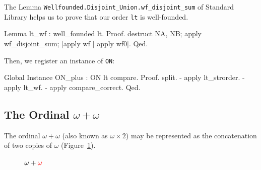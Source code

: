 The Lemma \texttt{Wellfounded.Disjoint\_Union.wf\_disjoint\_sum} of Standard Library
helps us to prove that our order \texttt{lt} is well-founded.

\begin{Coqsrc}
Lemma lt_wf : well_founded lt.
Proof. 
  destruct NA, NB; apply wf_disjoint_sum; [apply wf | apply wf0].
Qed.
\end{Coqsrc}

Then, we register an instance of \texttt{ON}:

\begin{Coqsrc}
Global Instance ON_plus : ON lt compare.
Proof.
  split.
  - apply lt_strorder.
  -  apply lt_wf.
  - apply compare_correct.
Qed.
\end{Coqsrc}






\subsection{The Ordinal \texorpdfstring{$\omega+\omega$}{omega + omega}}

The ordinal $\omega+\omega$ (also known as $\omega\times 2$) may be represented as the concatenation 
of two copies of $\omega$ (Figure~\ref{fig:omega-plus-omega}).

\begin{figure}[h]
   \centering
   \caption{\textcolor{blue}{$\omega+{\color{red}\omega}$}}
   \label{fig:omega-plus-omega}
 \end{figure}

